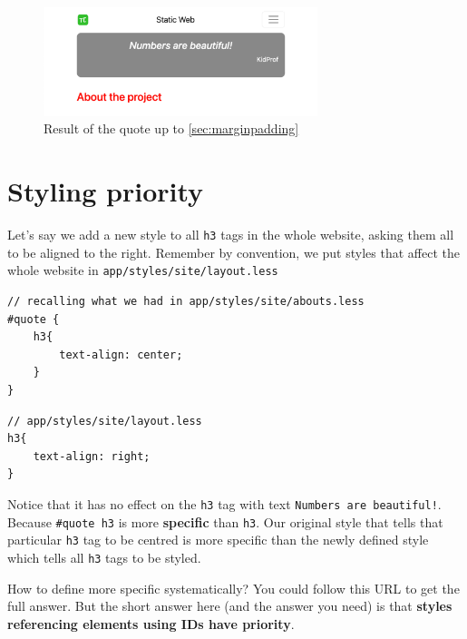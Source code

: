 \begin{figure}[H]
\centering
\includegraphics[width=8cm]{images/chn6-quote.png}
\caption{Result of the quote up to \cref{sec:marginpadding}}
\end{figure}


\section{Styling priority}
\label{sec:stylingpriority}

Let's say we add a new style to all \texttt{h3} tags in the whole website, asking them all to be aligned to the right. Remember by convention, we put styles that affect the whole website in \texttt{app/styles/site/layout.less}

\begin{lstlisting}[language=pug]
// recalling what we had in app/styles/site/abouts.less
#quote {
    h3{
        text-align: center;
    }
}
\end{lstlisting}

\begin{lstlisting}[language=pug]
// app/styles/site/layout.less
h3{
    text-align: right;
}
\end{lstlisting}

Notice that it has no effect on the \texttt{h3} tag with text \texttt{Numbers are beautiful!}. Because \texttt{\#quote h3} is more \textbf{specific} than \texttt{h3}. Our original style that tells that particular \texttt{h3} tag to be centred is more specific than the newly defined style which tells all \texttt{h3} tags to be styled. 

How to define more specific systematically? You could follow this URL to get the full answer. But the short answer here (and the answer you need) is that \textbf{styles referencing elements using IDs have priority}.

